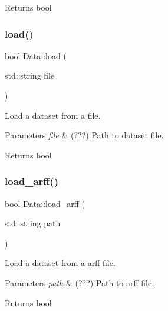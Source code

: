 \begin{DoxyReturn}{Returns}
bool 
\end{DoxyReturn}
\mbox{\label{class_data_ac2ed251251be234c607f486e16902112}} 
\subsubsection{\texorpdfstring{load()}{load()}}
{\footnotesize\ttfamily bool Data\+::load (\begin{DoxyParamCaption}\item[{std\+::string}]{file }\end{DoxyParamCaption})}



Load a dataset from a file. 


\begin{DoxyParams}{Parameters}
{\em file} & (???) Path to dataset file. \\
\hline
\end{DoxyParams}
\begin{DoxyReturn}{Returns}
bool 
\end{DoxyReturn}
\mbox{\label{class_data_af7b0e31d7dd93fdb3788d30f5ce38693}} 
\subsubsection{\texorpdfstring{load\+\_\+arff()}{load\_arff()}}
{\footnotesize\ttfamily bool Data\+::load\+\_\+arff (\begin{DoxyParamCaption}\item[{std\+::string}]{path }\end{DoxyParamCaption})}



Load a dataset from a arff file. 


\begin{DoxyParams}{Parameters}
{\em path} & (???) Path to arff file. \\
\hline
\end{DoxyParams}
\begin{DoxyReturn}{Returns}
bool 
\end{DoxyReturn}
\mbox{\label{class_data_a0083fa28fc5282e095c87d79588e9292}} 
